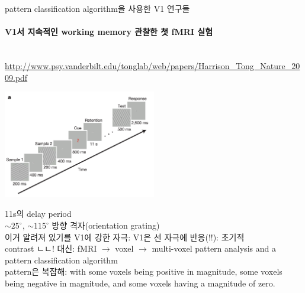 \documentclass[../note.tex]{subfiles}
\begin{document}
\begin{note}{pattern classification algorithm을 사용한 V1 연구들}
  \paragraph{V1서 지속적인 working memory 관찰한 첫 fMRI 실험}\\
  \url{http://www.psy.vanderbilt.edu/tonglab/web/papers/Harrison_Tong_Nature_2009.pdf}
  \begin{center}
    \includegraphics[width=0.5\textwidth]{image/ch6_grating_blueprint}
    \label{fig:ch6_grating_blueprint}
  \end{center}
  11s의 delay period\\
  $\sim25^{\circ}$, $\sim115^{\circ}$ 방향 격자(orientation grating)\\
  이거 알려져 있기를 V1에 강한 자극: V1은 선 자극에 반응(!!): 초기적\\
  contrast ㄴㄴ! 대신: fMRI $\rightarrow$ voxel $\rightarrow$ multi-voxel pattern analysis and a pattern classification algorithm\\
  pattern은 복잡해: with some voxels being positive
in magnitude, some voxels being negative in magnitude, and some voxels
having a magnitude of zero.\\


\end{note}
\end{document}
